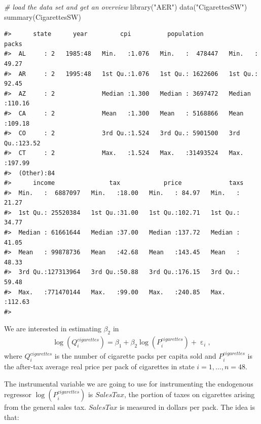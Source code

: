 \documentclass[
  14pt,
]{memoir}
\newenvironment{Shaded}{\begin{snugshade}}{\end{snugshade}}
\newcommand{\CommentTok}[1]{\textcolor[rgb]{0.56,0.35,0.01}{\textit{#1}}}
\newcommand{\FunctionTok}[1]{\textcolor[rgb]{0.00,0.00,0.00}{#1}}
\newcommand{\NormalTok}[1]{#1}
\newcommand{\StringTok}[1]{\textcolor[rgb]{0.31,0.60,0.02}{#1}}
\DeclareMathOperator{\eps}{\varepsilon}
\begin{document}
\begin{Shaded}
\begin{Highlighting}[]
\CommentTok{\# load the data set and get an overview}
\FunctionTok{library}\NormalTok{(}\StringTok{"AER"}\NormalTok{)}
\FunctionTok{data}\NormalTok{(}\StringTok{"CigarettesSW"}\NormalTok{)}
\FunctionTok{summary}\NormalTok{(CigarettesSW)}
\end{Highlighting}
\end{Shaded}

\begin{verbatim}
#>      state      year         cpi          population           packs       
#>  AL     : 2   1985:48   Min.   :1.076   Min.   :  478447   Min.   : 49.27  
#>  AR     : 2   1995:48   1st Qu.:1.076   1st Qu.: 1622606   1st Qu.: 92.45  
#>  AZ     : 2             Median :1.300   Median : 3697472   Median :110.16  
#>  CA     : 2             Mean   :1.300   Mean   : 5168866   Mean   :109.18  
#>  CO     : 2             3rd Qu.:1.524   3rd Qu.: 5901500   3rd Qu.:123.52  
#>  CT     : 2             Max.   :1.524   Max.   :31493524   Max.   :197.99  
#>  (Other):84                                                                
#>      income               tax            price             taxs       
#>  Min.   :  6887097   Min.   :18.00   Min.   : 84.97   Min.   : 21.27  
#>  1st Qu.: 25520384   1st Qu.:31.00   1st Qu.:102.71   1st Qu.: 34.77  
#>  Median : 61661644   Median :37.00   Median :137.72   Median : 41.05  
#>  Mean   : 99878736   Mean   :42.68   Mean   :143.45   Mean   : 48.33  
#>  3rd Qu.:127313964   3rd Qu.:50.88   3rd Qu.:176.15   3rd Qu.: 59.48  
#>  Max.   :771470144   Max.   :99.00   Max.   :240.85   Max.   :112.63  
#> 
\end{verbatim}

We are interested in estimating \(\beta_2\) in
\begin{align}
  \log(Q_i^{cigarettes}) = \beta_1 + \beta_2 \log(P_i^{cigarettes}) + \eps_i, \label{eq:cigstsls}
\end{align}
where \(Q_i^{cigarettes}\) is the number of cigarette packs per capita sold and \(P_i^{cigarettes}\) is the after-tax average real price per pack of cigarettes in state \(i=1,\dots,n=48\).

The instrumental variable we are going to use for instrumenting the endogenous regressor \(\log(P_i^{cigarettes})\) is \(SalesTax\), the portion of taxes on cigarettes arising from the general sales tax. \(SalesTax\) is measured in dollars per pack. The idea is that:
\end{document}
